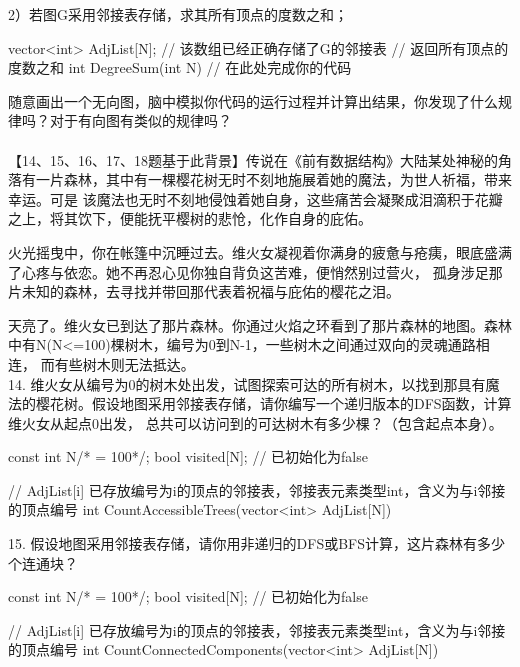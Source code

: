 2）若图G采用邻接表存储，求其所有顶点的度数之和；
\begin{cppcode}
    vector<int> AdjList[N]; // 该数组已经正确存储了G的邻接表
    // 返回所有顶点的度数之和
    int DegreeSum(int N) {
        // 在此处完成你的代码
    }
\end{cppcode}

随意画出一个无向图，脑中模拟你代码的运行过程并计算出结果，你发现了什么规律吗？对于有向图有类似的规律吗？\\\\



【14、15、16、17、18题基于此背景】传说在《前有数据结构》大陆某处神秘的角落有一片森林，其中有一棵樱花树无时不刻地施展着她的魔法，为世人祈福，带来幸运。可是
该魔法也无时不刻地侵蚀着她自身，这些痛苦会凝聚成泪滴积于花瓣之上，将其饮下，便能抚平樱树的悲怆，化作自身的庇佑。

火光摇曳中，你在帐篷中沉睡过去。维火女凝视着你满身的疲惫与疮痍，眼底盛满了心疼与依恋。她不再忍心见你独自背负这苦难，便悄然别过营火，
孤身涉足那片未知的森林，去寻找并带回那代表着祝福与庇佑的樱花之泪。

天亮了。维火女已到达了那片森林。你通过火焰之环看到了那片森林的地图。森林中有N(N<=100)棵树木，编号为0到N-1，一些树木之间通过双向的灵魂通路相连，
而有些树木则无法抵达。\\


14. 维火女从编号为0的树木处出发，试图探索可达的所有树木，以找到那具有魔法的樱花树。假设地图采用邻接表存储，请你编写一个递归版本的DFS函数，计算维火女从起点0出发，
总共可以访问到的可达树木有多少棵？（包含起点本身）。

\begin{cppcode}
    const int N/* = 100*/;
    bool visited[N];    // 已初始化为false

    // AdjList[i] 已存放编号为i的顶点的邻接表，邻接表元素类型int，含义为与i邻接的顶点编号
    int CountAccessibleTrees(vector<int> AdjList[N]) {

    }
\end{cppcode}

\vspace{\baselineskip}

15. 假设地图采用邻接表存储，请你用非递归的DFS或BFS计算，这片森林有多少个连通块？
\begin{cppcode}
    const int N/* = 100*/;
    bool visited[N];    // 已初始化为false

    // AdjList[i] 已存放编号为i的顶点的邻接表，邻接表元素类型int，含义为与i邻接的顶点编号
    int CountConnectedComponents(vector<int> AdjList[N]) {

    }
\end{cppcode}

